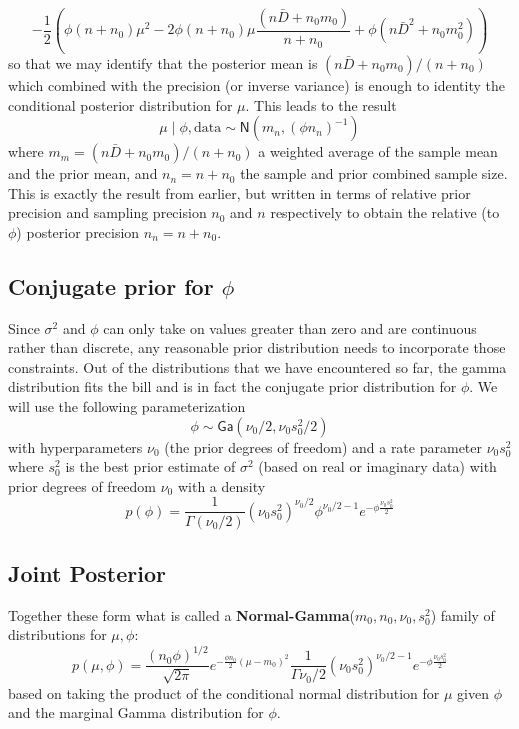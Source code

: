\documentclass[11pt]{article}
\def\No{\textsf{N}}
\def\Ga{\textsf{Ga}}
\def\data{\text{data}}
\begin{document}
 \begin{equation}-\frac 1 2 \left(\phi( n + n_0) \mu^2 - 2 \phi ( n + n_0) \mu \frac{(n \bar{D} + n_0 m_0) } {n + n_0} + \phi (n \bar{D}^2 + n_0 m_0^2) \right)  \label{eq:quad}
 \end{equation}
 so that we may identify that the posterior mean is $(n \bar{D} + n_0 m_0) /(n + n_0)$ which combined with the precision (or inverse variance) is enough to identity the conditional posterior distribution for $\mu$.  This leads to the result
$$ \mu \mid \phi, \data \sim \No(m_n, (\phi n_n)^{-1})
$$
where $m_m = (n \bar{D} + n_0 m_0) /(n + n_0)$ a weighted average of the sample mean and the prior mean, and
$n_n = n + n_0$ the sample and prior combined sample size.   This is exactly the result from earlier, but written in terms of relative prior precision and sampling precision $n_0$ and $n$ respectively to obtain the relative (to $\phi$) posterior precision $n_n = n + n_0$.






\subsection*{Conjugate prior for $\phi$}
Since $\sigma^2$ and $\phi$ can only take on values greater than zero and are continuous rather than discrete,  any reasonable prior distribution needs to incorporate those constraints.  Out of the distributions that we have encountered so far,
the gamma distribution fits the bill and is in fact the conjugate prior distribution for $\phi$.  We will use the following parameterization
$$
\phi \sim \Ga(\nu_0/2, \nu_0 s^2_0/2)
$$
with hyperparameters  $\nu_0$ (the prior degrees of freedom) and a rate parameter $\nu_0 s^2_0$ where $s^2_0$ is the best prior estimate of $\sigma^2$  (based on real or imaginary data) with prior degrees of freedom $\nu_0$ with a density
$$p(\phi) = \frac{1}{\Gamma(\nu_0/2)} (\nu_0 s^2_0 )^{\nu_0/2} \phi^{\nu_0/2 - 1} e^{- \phi \frac{\nu_0 s^2_0} {2}}
$$

\subsection*{Joint Posterior}
Together these form what is called a {\bf Normal-Gamma}($m_0, n_0, \nu_0, s^2_0$) family of distributions for $\mu, \phi$:
\begin{equation}
p(\mu, \phi) = \frac{(n_0 \phi)^{1/2}} {\sqrt{2\pi}} e^{- \frac{\phi n_0}{2} (\mu -m_0)^2} \frac{1}{\Gamma{\nu_0/2}} (\nu_0 s^2_0 )^{\nu_0/2 -1} e^{- \phi \frac{\nu_0 s^2_0} {2}}
\label{eq:NG}
\end{equation}
based on taking the product of the conditional normal distribution for $\mu$ given $\phi$ and the marginal Gamma  distribution for $\phi$.
\end{document}
